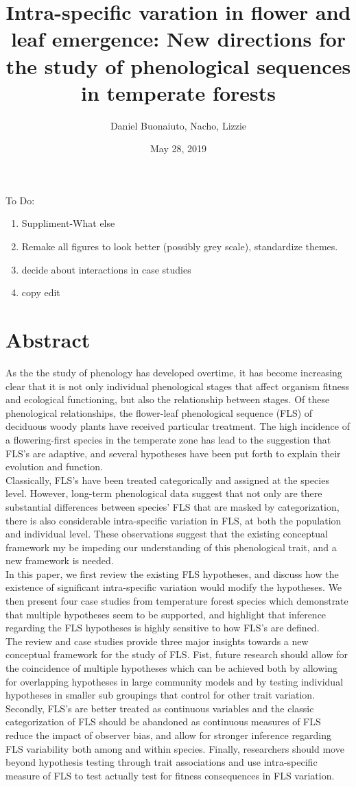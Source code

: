 \documentclass[12pt]{article}\usepackage[]{graphicx}\usepackage[]{color}
\title{Intra-specific varation in flower and leaf emergence: New directions for the study of phenological sequences in temperate forests}
\author{Daniel Buonaiuto, Nacho, Lizzie}
\date{May 28, 2019}
\begin{document}
\maketitle
To Do:
\begin{enumerate}
\item Suppliment-What else
\item Remake all figures to look better (possibly grey scale), standardize themes. 
\item decide about interactions in case studies
\item copy edit
\end{enumerate}
\section*{Abstract}

\indent\indent As the the study of phenology has developed overtime, it has become increasing clear that it is not only individual phenological stages that affect organism fitness and ecological functioning, but also the relationship between stages. Of these phenological relationships, the flower-leaf phenological sequence (FLS) of deciduous woody plants have received particular treatment. The high incidence of a  flowering-first species in the temperate zone has lead to the suggestion that FLS's are adaptive, and several hypotheses have been put forth to explain their evolution and function. \\
\indent Classically, FLS's have been treated categorically and assigned at the species level. However, long-term phenological data suggest that not only are there substantial differences between species' FLS that are masked by categorization, there is also considerable intra-specific variation in FLS, at both the population and individual level. These observations suggest that the existing conceptual framework my be impeding our understanding of this phenological trait, and a new framework is needed.\\
 In this paper, we first review the existing FLS hypotheses, and discuss how the existence of significant intra-specific variation would modify the hypotheses. We then present four case studies from temperature forest species which demonstrate that multiple hypotheses seem to be supported, and highlight that inference regarding the FLS hypotheses is highly sensitive to how FLS's are defined.\\
\indent The review and case studies provide three major insights towards a new conceptual framework for the study of FLS. Fist, future research should allow for the coincidence of multiple hypotheses which can be achieved both by allowing for overlapping hypotheses in large community models and by testing individual hypotheses in smaller sub groupings that control for other trait variation.
Secondly, FLS's are better treated as continuous variables and the classic categorization of FLS should be abandoned as continuous measures of FLS reduce the impact of observer bias, and allow for stronger inference regarding FLS variability both among and within species. Finally, researchers should move beyond hypothesis testing through trait associations and use intra-specific measure of FLS to test actually test for fitness consequences in FLS variation.
\end{document}

